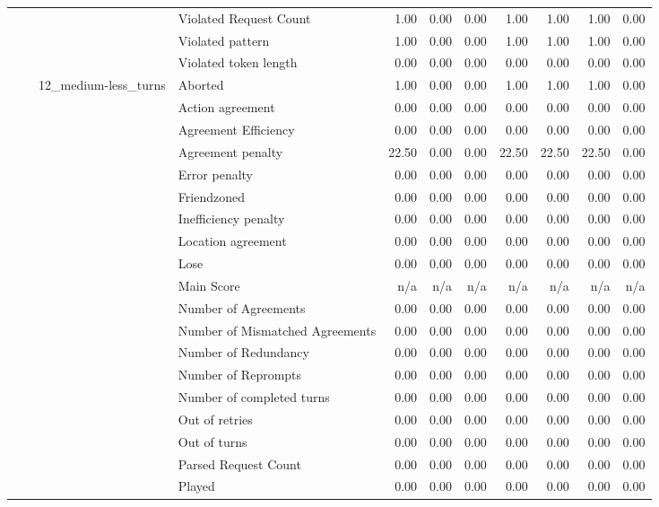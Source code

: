 \begin{tabular}{llllrrrrrrr}
 &  &  & Violated Request Count & 1.00 & 0.00 & 0.00 & 1.00 & 1.00 & 1.00 & 0.00 \\
 &  &  & Violated pattern & 1.00 & 0.00 & 0.00 & 1.00 & 1.00 & 1.00 & 0.00 \\
 &  &  & Violated token length & 0.00 & 0.00 & 0.00 & 0.00 & 0.00 & 0.00 & 0.00 \\
\cline{3-11}
 &  & \multirow[t]{27}{*}{12_medium-less_turns} & Aborted & 1.00 & 0.00 & 0.00 & 1.00 & 1.00 & 1.00 & 0.00 \\
 &  &  & Action agreement & 0.00 & 0.00 & 0.00 & 0.00 & 0.00 & 0.00 & 0.00 \\
 &  &  & Agreement Efficiency & 0.00 & 0.00 & 0.00 & 0.00 & 0.00 & 0.00 & 0.00 \\
 &  &  & Agreement penalty & 22.50 & 0.00 & 0.00 & 22.50 & 22.50 & 22.50 & 0.00 \\
 &  &  & Error penalty & 0.00 & 0.00 & 0.00 & 0.00 & 0.00 & 0.00 & 0.00 \\
 &  &  & Friendzoned & 0.00 & 0.00 & 0.00 & 0.00 & 0.00 & 0.00 & 0.00 \\
 &  &  & Inefficiency penalty & 0.00 & 0.00 & 0.00 & 0.00 & 0.00 & 0.00 & 0.00 \\
 &  &  & Location agreement & 0.00 & 0.00 & 0.00 & 0.00 & 0.00 & 0.00 & 0.00 \\
 &  &  & Lose & 0.00 & 0.00 & 0.00 & 0.00 & 0.00 & 0.00 & 0.00 \\
 &  &  & Main Score & n/a & n/a & n/a & n/a & n/a & n/a & n/a \\
 &  &  & Number of Agreements & 0.00 & 0.00 & 0.00 & 0.00 & 0.00 & 0.00 & 0.00 \\
 &  &  & Number of Mismatched Agreements & 0.00 & 0.00 & 0.00 & 0.00 & 0.00 & 0.00 & 0.00 \\
 &  &  & Number of Redundancy & 0.00 & 0.00 & 0.00 & 0.00 & 0.00 & 0.00 & 0.00 \\
 &  &  & Number of Reprompts & 0.00 & 0.00 & 0.00 & 0.00 & 0.00 & 0.00 & 0.00 \\
 &  &  & Number of completed turns & 0.00 & 0.00 & 0.00 & 0.00 & 0.00 & 0.00 & 0.00 \\
 &  &  & Out of retries & 0.00 & 0.00 & 0.00 & 0.00 & 0.00 & 0.00 & 0.00 \\
 &  &  & Out of turns & 0.00 & 0.00 & 0.00 & 0.00 & 0.00 & 0.00 & 0.00 \\
 &  &  & Parsed Request Count & 0.00 & 0.00 & 0.00 & 0.00 & 0.00 & 0.00 & 0.00 \\
 &  &  & Played & 0.00 & 0.00 & 0.00 & 0.00 & 0.00 & 0.00 & 0.00 \\

\end{tabular}
